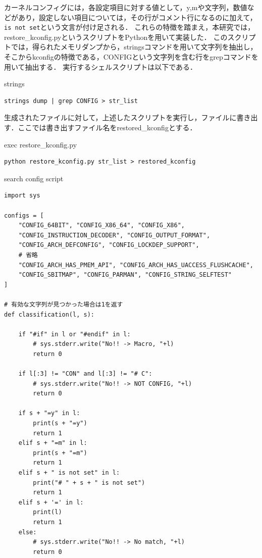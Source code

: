 カーネルコンフィグには，各設定項目に対する値として，y,mや文字列，数値などがあり，設定しない項目については，その行がコメント行になるのに加えて，\verb|is not set|という文言が付け足される．
これらの特徴を踏まえ，本研究では，restore_kconfig.pyというスクリプトをPythonを用いて実装した．
このスクリプトでは，得られたメモリダンプから，stringsコマンドを用いて文字列を抽出し，そこからkconfigの特徴である，CONFIGという文字列を含む行をgrepコマンドを用いて抽出する．
実行するシェルスクリプトは以下である．

\begin{itembox}[l]{strings}
    \begin{verbatim}
strings dump | grep CONFIG > str_list
    \end{verbatim}
\end{itembox}

生成されたファイルに対して，上述したスクリプトを実行し，ファイルに書き出す．ここでは書き出すファイル名をrestored_kconfigとする．

\begin{itembox}[l]{exec restore_kconfig.py}
    \begin{verbatim}
python restore_kconfig.py str_list > restored_kconfig
    \end{verbatim}
\end{itembox}

\begin{itembox}[l]{search config script}
    \begin{verbatim}
import sys

configs = [
    "CONFIG_64BIT", "CONFIG_X86_64", "CONFIG_X86",
    "CONFIG_INSTRUCTION_DECODER", "CONFIG_OUTPUT_FORMAT",
    "CONFIG_ARCH_DEFCONFIG", "CONFIG_LOCKDEP_SUPPORT",
    # 省略
    "CONFIG_ARCH_HAS_PMEM_API", "CONFIG_ARCH_HAS_UACCESS_FLUSHCACHE",
    "CONFIG_SBITMAP", "CONFIG_PARMAN", "CONFIG_STRING_SELFTEST"
]

# 有効な文字列が見つかった場合は1を返す
def classification(l, s):

    if "#if" in l or "#endif" in l:
        # sys.stderr.write("No!! -> Macro, "+l)
        return 0

    if l[:3] != "CON" and l[:3] != "# C":
        # sys.stderr.write("No!! -> NOT CONFIG, "+l)
        return 0

    if s + "=y" in l:
        print(s + "=y")
        return 1
    elif s + "=m" in l:
        print(s + "=m")
        return 1
    elif s + " is not set" in l:
        print("# " + s + " is not set")
        return 1
    elif s + '=' in l:
        print(l)
        return 1
    else:
        # sys.stderr.write("No!! -> No match, "+l)
        return 0

    \end{verbatim}
\end{itembox}


